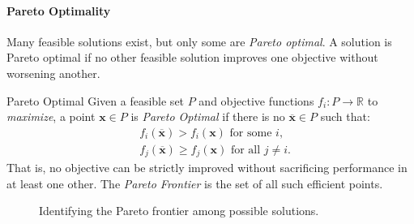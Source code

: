\paragraph{Pareto Optimality}

Many feasible solutions exist, but only some are \emph{Pareto optimal}. A solution is Pareto optimal if no other feasible solution improves one objective without worsening another.

\begin{definition}{Pareto Optimal}{}
Given a feasible set \(P\) and objective functions \(f_i: P \to \mathbb{R}\) to \emph{maximize}, a point \(\mathbf{x} \in P\) is \emph{Pareto Optimal} if there is no \(\overline{\mathbf{x}} \in P\) such that:
\[
\begin{aligned}
& f_i(\overline{\mathbf{x}}) > f_i(\mathbf{x}) \text{ for some } i, \\
& f_j(\overline{\mathbf{x}}) \ge f_j(\mathbf{x}) \text{ for all } j \ne i.
\end{aligned}
\]
That is, no objective can be strictly improved without sacrificing performance in at least one other. The \emph{Pareto Frontier} is the set of all such efficient points.
\end{definition}




\begin{figure}[h]
    \centering
    

    \caption{Identifying the Pareto frontier among possible solutions.}
\end{figure}


